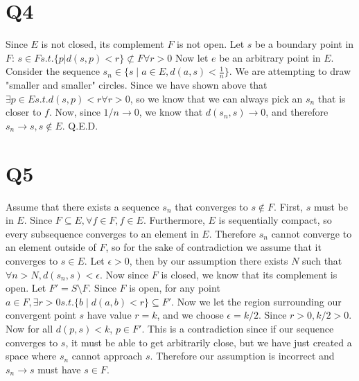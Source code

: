 \documentclass[12pt]{article}
\begin{document}
\section{Q4}
Since $E$ is not closed, its complement $F$ is not open. Let $s$ be a boundary point in $F$: $s \in F s.t. \{p|d(s,p)<r \} \not\subset F \forall r > 0$
\newline
Now let $e$ be an arbitrary point in $E$. Consider the sequence $s_n \in \{s \mid a\in E, d(a,s)<\frac{1}{n}\}$. We are attempting to draw "smaller and smaller" circles. Since we have shown above that $\exists p \in E s.t. d(s,p)<r \forall r>0$, so we know that we can always pick an $s_n$ that is closer to $f$. Now, since $1/n \to 0$, we know that $d(s_n, s)\to 0$, and therefore $s_n \to s, s \notin E$. Q.E.D.
\newpage


\section{Q5}
Assume that there exists a sequence $s_n$ that converges to $s \notin F$.
\newline
First, $s$ must be in $E$. Since $F \subseteq E, \forall f \in F, f \in E$. Furthermore, $E$ is sequentially compact, so every subsequence converges to an element in $E$. Therefore $s_n$ cannot converge to an element outside of $F$, so for the sake of contradiction we assume that it converges to $s \in E$.
\newline
Let $\epsilon > 0$, then by our assumption there exists $N$ such that $\forall n>N, d(s_n, s)<\epsilon$. Now since $F$ is closed, we know that its complement is open. Let $F' = S \setminus F$. Since $F$ is open, for any point $a \in F, \exists r>0 s.t. \{b \mid d(a,b)<r\} \subseteq F'$.
\newline
Now we let the region surrounding our convergent point $s$ have value $r = k$, and we choose $\epsilon = k/2$. Since $r>0, k/2>0$. Now for all $d(p,s)<k$, $p \in F'$. This is a contradiction since if our sequence converges to $s$, it must be able to get arbitrarily close, but we have just created a space where $s_n$ cannot approach $s$. \lightning
\newline
Therefore our assumption is incorrect and $s_n \to s$ must have $s \in F$.
\newpage
\end{document}
